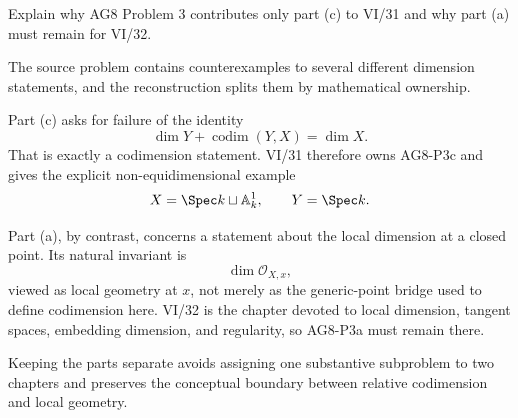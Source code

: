 \begin{problem}\label{prob:vi31-20}
Explain why AG8 Problem 3 contributes only part (c) to VI/31 and why part (a) must remain for VI/32.
\end{problem}

\ifdefined\FullProblemDossiers
\begin{solution}
The source problem contains counterexamples to several different dimension statements, and the reconstruction
splits them by mathematical ownership.

Part (c) asks for failure of the identity
\[
\dim Y+\operatorname{codim}(Y,X)=\dim X.
\]
That is exactly a codimension statement. VI/31 therefore owns AG8-P3c and gives the explicit
non-equidimensional example
\[
X=\Spec k\sqcup\mathbb A^1_k,
\qquad
Y=\Spec k.
\]

Part (a), by contrast, concerns a statement about the local dimension at a closed point. Its natural invariant is
\[
\dim\mathcal O_{X,x},
\]
viewed as local geometry at \(x\), not merely as the generic-point bridge used to define codimension here.
VI/32 is the chapter devoted to local dimension, tangent spaces, embedding dimension, and regularity, so AG8-P3a
must remain there.

Keeping the parts separate avoids assigning one substantive subproblem to two chapters and preserves the
conceptual boundary between relative codimension and local geometry.
\end{solution}
\fi
